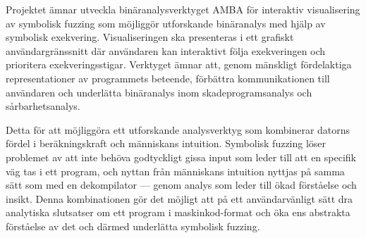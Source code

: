 
Projektet ämnar utveckla binäranalysverktyget AMBA för interaktiv visualisering
av symbolisk fuzzing som möjliggör utforskande binäranalys med hjälp av
symbolisk exekvering. Visualiseringen ska presenteras i ett grafiskt
användargränssnitt där användaren kan interaktivt följa exekveringen och
prioritera exekveringsstigar. Verktyget ämnar att, genom mänskligt fördelaktiga
representationer av programmets beteende, förbättra kommunikationen till
användaren och underlätta binäranalys inom skadeprogramsanalys och
sårbarhetsanalys.

Detta för att möjliggöra ett utforskande analysverktyg som kombinerar datorns
fördel i beräkningskraft och människans intuition. Symbolisk fuzzing löser
problemet av att inte behöva godtyckligt gissa input som leder till att en
specifik väg tas i ett program, och nyttan från människans intuition nyttjas på
samma sätt som med en dekompilator --- genom analys som leder till ökad
förståelse och insikt. Denna kombinationen gör det möjligt att på ett
användarvänligt sätt dra analytiska slutsatser om ett program i maskinkod-format
och öka ens abstrakta förståelse av det och därmed underlätta symbolisk fuzzing.
